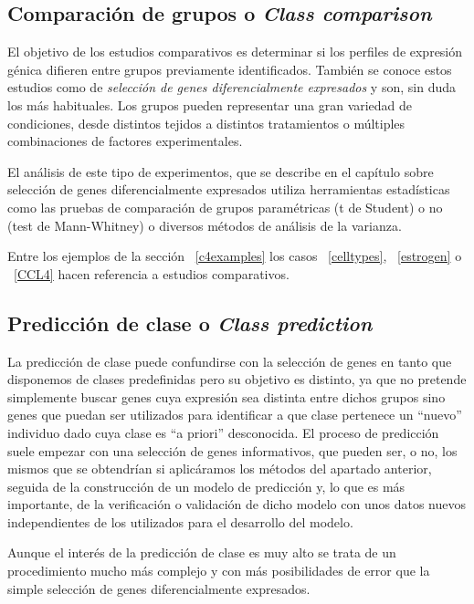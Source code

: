 \subsection{Comparaci\'on de grupos o \emph{Class comparison}}

El objetivo de los estudios comparativos es determinar si los perfiles de expresi\'on g\'enica difieren entre grupos previamente identificados. Tambi\'en se conoce estos estudios como de \emph{selecci\'on de  genes diferencialmente expresados} y son, sin duda los m\'as habituales. Los grupos pueden representar una gran variedad de condiciones, desde distintos tejidos a distintos tratamientos o m\'ultiples combinaciones de factores experimentales.

El an\'alisis de este tipo de experimentos, que se describe en el cap\'itulo sobre selecci\'on de genes diferencialmente expresados utiliza herramientas estad\'isticas como las pruebas de comparaci\'on de grupos param\'etricas (t de Student) o no (test de Mann-Whitney) o diversos m\'etodos de an\'alisis de la varianza.

Entre los ejemplos de la secci\'on ~\ref{c4examples} los casos  ~\ref{celltypes}, ~\ref{estrogen} o ~\ref{CCL4} hacen referencia a estudios comparativos.

\subsection{Predicci\'on de clase o \emph{Class prediction}}

La predicci\'on de clase puede confundirse con la selecci\'on de genes en tanto que disponemos de clases predefinidas pero su objetivo es distinto, ya que no pretende simplemente buscar genes cuya expresi\'on sea distinta entre dichos grupos sino genes que puedan ser utilizados para identificar a que clase pertenece un ``nuevo'' individuo dado cuya clase es ``a priori'' desconocida. El proceso de predicci\'on suele empezar con una selecci\'on de genes informativos, que pueden ser, o no, los mismos que se obtendr\'ian si aplic\'aramos los m\'etodos del apartado anterior, seguida de la construcci\'on de un modelo de predicci\'on y, lo que es m\'as importante, de la verificaci\'on o validaci\'on de dicho modelo con unos datos nuevos independientes de los utilizados para el desarrollo del modelo.

Aunque el inter\'es de la predicci\'on de clase es muy alto se trata de un procedimiento mucho m\'as complejo y con m\'as posibilidades de error que la simple selecci\'on de genes diferencialmente expresados.

